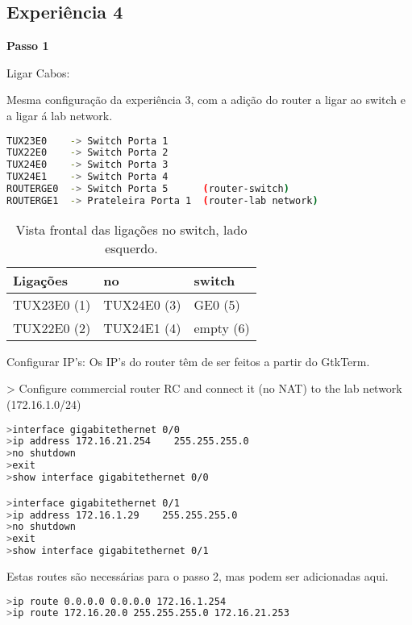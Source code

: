 \subsection{Experiência 4} \label{exp4_steps}
\textbf{Passo 1}

Ligar Cabos:

Mesma configuração da experiência 3, com a adição do router a ligar ao switch e a ligar á lab network.

\begin{lstlisting}[language=bash]
TUX23E0    -> Switch Porta 1 
TUX22E0    -> Switch Porta 2
TUX24E0    -> Switch Porta 3
TUX24E1    -> Switch Porta 4
ROUTERGE0  -> Switch Porta 5      (router-switch)
ROUTERGE1  -> Prateleira Porta 1  (router-lab network)
\end{lstlisting}

\begin{table}[h]
    \centering
    \begin{tabular}{|l|l|l|}
    \hline
        Ligações & no & switch \\ \hline
        TUX23E0 (1) & TUX24E0 (3) & GE0 (5) \\ \hline
        TUX22E0 (2) & TUX24E1 (4) & empty (6) \\ \hline
    \end{tabular}
    \caption{\label{tab:table-name}Vista frontal das ligações no switch, lado esquerdo.}
\end{table}

Configurar IP's: Os IP's do router têm de ser feitos a partir do GtkTerm.

> Configure commercial router RC and connect it (no NAT) to the lab network (172.16.1.0/24)

\begin{lstlisting}[language=bash]
>interface gigabitethernet 0/0                 
>ip address 172.16.21.254    255.255.255.0   
>no shutdown 
>exit 
>show interface gigabitethernet 0/0     

>interface gigabitethernet 0/1                
>ip address 172.16.1.29    255.255.255.0       
>no shutdown 
>exit 
>show interface gigabitethernet 0/1     
\end{lstlisting}

Estas routes são necessárias para o passo 2, mas podem ser adicionadas aqui.
\begin{lstlisting}[language=bash]
>ip route 0.0.0.0 0.0.0.0 172.16.1.254 
>ip route 172.16.20.0 255.255.255.0 172.16.21.253
\end{lstlisting}

